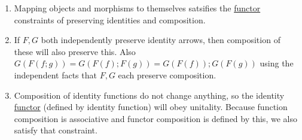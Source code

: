 \begin{enumerate}
    \item  Mapping objects and morphisms to themselves satsifies the \href{doc/1 math/Seven Sketches in Compositionality/Chapter 3: Databases/3 Functors, natural transformations, and databases/2 Functors/1 Functor}{functor} constraints of preserving identities and composition.
    \item If $F,G$ both independently preserve identity arrows, then composition of these will also preserve this. Also $G(F(f;g))=G(F(f);F(g))=G(F(f));G(F(g))$ using the independent facts that $F,G$ each preserve composition.
    \item Composition of identity functions do not change anything, so the identity \href{doc/1 math/Seven Sketches in Compositionality/Chapter 3: Databases/3 Functors, natural transformations, and databases/2 Functors/1 Functor}{functor} (defined by identity function) will obey unitality. Because function composition is associative and functor composition is defined by this, we also satisfy that constraint.

  \end{enumerate}
